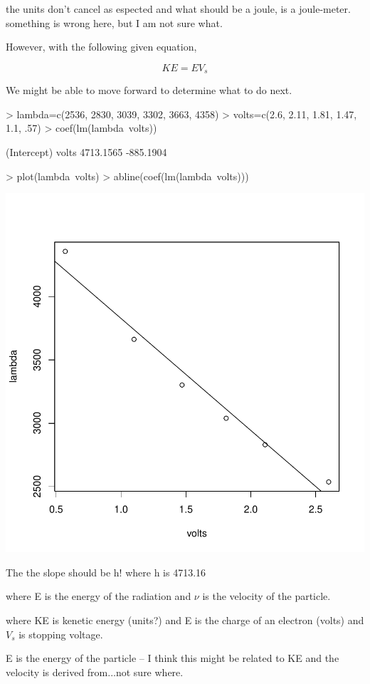 \documentclass{article}
\begin{document}
\noindent the units don't cancel as espected and what should be a joule, is a joule-meter. something is wrong here, but I am not sure what.

However, with the following given equation, 

\begin{equation}
KE = EV_s
\end{equation}

We might be able to move forward to determine what to do next. 


\begin{Schunk}
\begin{Sinput}
> lambda=c(2536, 2830, 3039, 3302, 3663, 4358)
> volts=c(2.6, 2.11, 1.81, 1.47, 1.1, .57)
> coef(lm(lambda~volts))
\end{Sinput}
\begin{Soutput}
(Intercept)       volts 
  4713.1565   -885.1904 
\end{Soutput}
\begin{Sinput}
> plot(lambda~volts)
> abline(coef(lm(lambda~volts)))
\end{Sinput}
\end{Schunk}
\includegraphics{Chemistry1-003}

The the slope should be h!  where h is 4713.16


\noindent where E is the energy of the radiation and $\nu$ is the velocity of the particle. 





\noindent where KE is kenetic energy (units?) and E is the charge of an electron (volts) and $V_s$ is stopping voltage.


\noindent E is the energy of the particle -- I think this might be related to KE and the velocity is derived from...not sure where.
\end{document}
